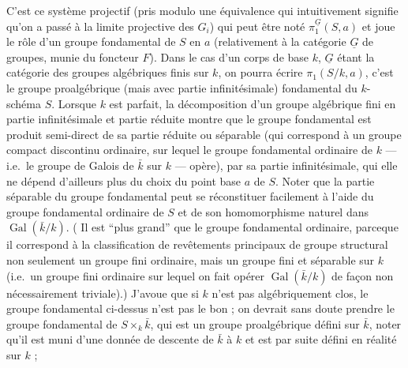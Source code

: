 \documentclass[11pt,a4paper]{article}
\begin{document}
C'est ce système projectif (pris modulo une équivalence qui intuitivement
signifie qu'on a passé à la limite projective des $G_{i}$) qui peut être noté
$\pi_{1}^{\underline{G}}(S, a)$ et joue le rôle d'un groupe fondamental de $S$
en $a$ (relativement à la catégorie $\underline{G}$ de groupes, munie du
foncteur $F$). Dans le cas \struck{\ill{}} d'un corps de base $k$,
$\underline{G}$ étant la catégorie des groupes algébriques finis sur $k$, on
pourra écrire $\pi_{1}(S/k, a)$, c'est le groupe proalgébrique (mais avec
partie infinitésimale) fondamental du $k$-schéma $S$. 
Lorsque $k$ est parfait, la décomposition d'un groupe algébrique fini en partie
infinitésimale et partie réduite montre que le groupe fondamental est produit
semi-direct de sa partie réduite ou séparable \struck{\ill{}} (qui correspond à
un groupe compact discontinu ordinaire, sur lequel le groupe fondamental
ordinaire de $k$ --- i.e.\ le groupe de Galois de $\bar{k}$ sur $k$ --- opère),
par sa partie infinitésimale, \struck{\ill{}} qui elle ne dépend d'ailleurs
plus du choix du point base $a$ de $S$.  Noter que la partie séparable du groupe
fondamental peut se réconstituer facilement à l'aide du groupe fondamental
ordinaire de $S$ et de son homomorphisme naturel dans
$\operatorname{Gal}(\bar{k}/k)$. ( Il est ``plus grand'' que le
groupe fondamental ordinaire, parceque il correspond à la classification de
revêtements principaux de groupe structural non seulement un groupe fini
ordinaire, mais un groupe \struck{\ill{}} fini et séparable sur $k$ (i.e.\ un
groupe fini ordinaire sur lequel on fait opérer
$\operatorname{Gal}(\bar{k}/k)$ de façon non nécessairement triviale).)
\struck{\ill{}} J'avoue que si $k$ n'est pas algébriquement clos, le groupe
fondamental ci-dessus n'est   pas le bon ; on
devrait sans doute prendre le groupe fondamental de $S \times_{k} \bar{k}$, qui
est un groupe proalgébrique défini sur $\bar{k}$, noter qu'il est muni d'une
donnée de descente de $\bar{k}$ à $k$ et est par suite défini en réalité sur
$k$ ; 


\end{document}
